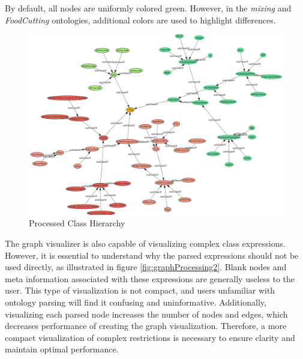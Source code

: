 By default, all nodes are uniformly colored green. However, in the \textit{mixing} and \textit{FoodCutting} ontologies, 
additional colors are used to highlight differences.
\begin{figure}[H]
    \includegraphics[scale=0.5]{Graphics/OwlVisualizer/graphProcessing1.png}
    \centering
    \caption{Processed Class Hierarchy}
\end{figure}

The graph visualizer is also capable of visualizing complex class expressions. 
However, it is essential to understand why the parsed expressions should not be used directly, as illustrated in figure \ref{fig:graphProcessing2}. 
Blank nodes and meta information associated with these expressions are generally useless to the user. 
This type of visualization is not compact, and users unfamiliar with ontology parsing will find it confusing and uninformative. 
Additionally, visualizing each parsed node increases the number of nodes and edges, which decreases performance of creating the graph visualization. 
Therefore, a more compact visualization of complex restrictions is necessary to ensure clarity and maintain optimal performance.

